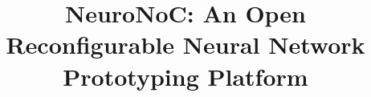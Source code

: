 \documentclass[10pt,conference,a4paper]{IEEEtran}
\begin{document}
%
\title{NeuroNoC: An Open Reconfigurable Neural Network Prototyping Platform}

\maketitle              %
%

%
%
%












%
% 
\end{document}
